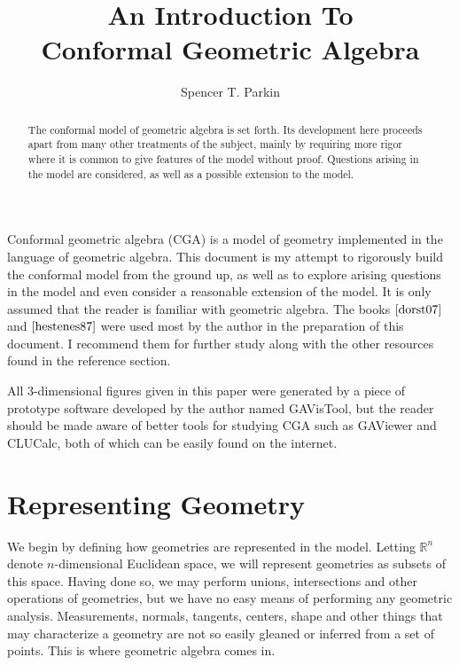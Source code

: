 \documentclass[12pt]{article}
\title{An Introduction To\\Conformal Geometric Algebra}
\author{Spencer T. Parkin}
\newcommand{\R}{\mathbb{R}}
\begin{document}
\maketitle

\begin{abstract}
The conformal model of geometric algebra is set forth.
Its development here proceeds apart from many other treatments
of the subject, mainly by requiring more rigor where it is common
to give features of the model without proof. Questions arising
in the model are considered, as well as a possible extension to the model.
\end{abstract}

Conformal geometric algebra (CGA) is a model of
geometry implemented in the language of geometric algebra.
This document is my attempt to rigorously build the
conformal model from the ground up, as well as to explore
arising questions in the model and even consider a reasonable
extension of the model.
It is only assumed that the reader is familiar with geometric algebra.
The books $\cite{dorst07}$ and $\cite{hestenes87}$ were
used most by the author in the preparation of this document.
I recommend them for further study along with the other resources
found in the reference section.

All 3-dimensional figures given in this paper were generated
by a piece of prototype software developed by the author named GAVisTool,
but the reader should be made aware
of better tools for studying CGA such as GAViewer
and CLUCalc, both of which can be easily found on the internet.

\nocite{zaharia02}
\nocite{hildenbrand05}

\section{Representing Geometry}

We begin by defining how geometries are represented in the model.
Letting $\R^n$ denote $n$-dimensional Euclidean space, we will
represent geometries as subsets of this space.  Having done so,
we may perform unions, intersections and other operations of geometries, but we
have no easy means of performing any geometric analysis.  Measurements, normals,
tangents, centers, shape and other things that may characterize a geometry are not
so easily gleaned or inferred from a set of points.  This is where
geometric algebra comes in.
\end{document}
